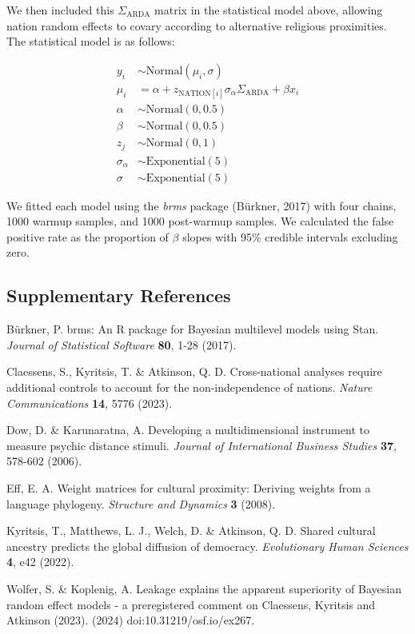 We then included this $\Sigma_\text{ARDA}$ matrix in the statistical model 
above, allowing nation random effects to covary according to alternative
religious proximities. The statistical model is as follows:

\begin{align}
y_{i} &\sim \text{Normal}(\mu_{i},\sigma) \nonumber \\
\mu_{i} &= \alpha + z_{\text{NATION}[i]}\sigma_{\alpha}\Sigma_\text{ARDA} + 
\beta x_{i} \nonumber \\
\alpha &\sim \text{Normal}(0, 0.5) \nonumber \\
\beta &\sim \text{Normal}(0, 0.5) \nonumber \\
z_{j} &\sim \text{Normal}(0, 1) \nonumber \\
\sigma_{\alpha} &\sim \text{Exponential}(5) \nonumber \\
\sigma &\sim \text{Exponential}(5) \nonumber
\end{align}

We fitted each model using the \textit{brms} package (Bürkner, 2017) with four 
chains, 1000 warmup samples, and 1000 post-warmup samples. We calculated the 
false positive rate as the proportion of $\beta$ slopes with 95\% credible 
intervals excluding zero.

\subsection*{Supplementary References}

Bürkner, P. brms: An R package for Bayesian multilevel models using Stan. 
\textit{Journal of Statistical Software} \textbf{80}, 1-28 (2017).

Claessens, S., Kyritsis, T. \& Atkinson, Q. D. Cross-national analyses require 
additional controls to account for the non-independence of nations.
\textit{Nature Communications} \textbf{14}, 5776 (2023).

Dow, D. \& Karunaratna, A. Developing a multidimensional instrument to measure 
psychic distance stimuli. \textit{Journal of International Business Studies}
\textbf{37}, 578-602 (2006).

Eff, E. A. Weight matrices for cultural proximity: Deriving weights from a 
language phylogeny. \textit{Structure and Dynamics} \textbf{3} (2008).

Kyritsis, T., Matthews, L. J., Welch, D. \& Atkinson, Q. D. Shared cultural 
ancestry predicts the global diffusion of democracy. \textit{Evolutionary Human 
Sciences} \textbf{4}, e42 (2022).

Wolfer, S. \& Koplenig, A. Leakage explains the apparent superiority of Bayesian
random effect models - a preregistered comment on Claessens, Kyritsis and 
Atkinson (2023). (2024) doi:10.31219/osf.io/ex267.
